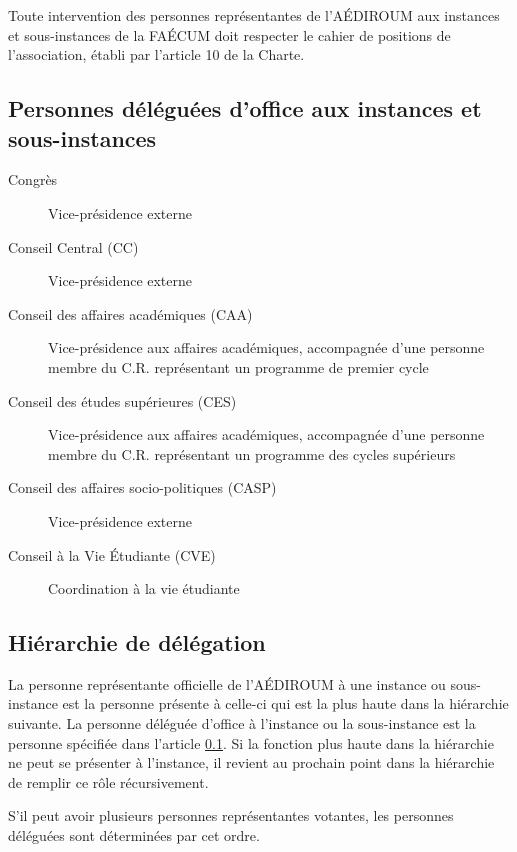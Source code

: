 \documentclass{aediroum}
\newcommand{\article}[1]{article \ref{#1}}
\begin{document}
Toute intervention des personnes représentantes de l’AÉDIROUM aux instances et sous-instances de la FAÉCUM doit respecter le cahier de positions de l’association, établi par l’article 10 de la Charte.

\subsection{Personnes déléguées d’office aux instances et sous-instances}\label{sec:delegues-doffice-instances}

\begin{description}
    \item[Congrès] Vice-présidence externe
    \item[Conseil Central (CC)] Vice-présidence externe
    \item[Conseil des affaires académiques (CAA)] Vice-présidence aux affaires académiques, accompagnée d’une personne membre du C.R. représentant
    un programme de premier cycle
    \item[Conseil des études supérieures (CES)] Vice-présidence aux affaires académiques, accompagnée
    d’une personne membre du C.R. représentant un programme des cycles supérieurs
    \item[Conseil des affaires socio-politiques (CASP)] Vice-présidence externe
    \item[Conseil à la Vie Étudiante (CVE)] Coordination à la vie étudiante
\end{description}

\subsection{Hiérarchie de délégation}\label{sec:hierarchie-delegues-faecum}

La personne représentante officielle de l'AÉDIROUM à une instance ou sous-instance est la personne présente à celle-ci qui est la plus haute dans la hiérarchie suivante. La personne déléguée d'office à l'instance ou la sous-instance est la personne spécifiée dans l'\article{sec:delegues-doffice-instances}. Si la fonction plus haute dans la hiérarchie ne peut se présenter à l'instance, il revient au prochain point dans la hiérarchie de remplir ce rôle récursivement.

S'il peut avoir plusieurs personnes représentantes votantes, les personnes déléguées sont déterminées par cet ordre.
\end{document}
